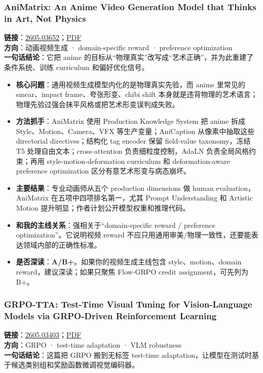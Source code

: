 \subsubsection{AniMatrix: An Anime Video Generation Model that Thinks in Art, Not Physics}

\textbf{链接}：\href{https://arxiv.org/abs/2605.03652}{2605.03652}；\href{https://arxiv.org/pdf/2605.03652}{PDF}\\
\textbf{方向}：动画视频生成 · domain-specific reward · preference optimization\\
\textbf{一句话结论}：它把 anime 的目标从“物理真实”改写成“艺术正确”，并为此重建了条件系统、训练 curriculum 和偏好优化信号。

\begin{itemize}[leftmargin=1.5em]
  \item \textbf{核心问题}：通用视频生成模型内化的是物理真实先验，而 anime 里常见的 smear、impact frame、夸张形变、chibi shift 本身就是违背物理的艺术语言；物理先验过强会抹平风格或把艺术形变误判成失败。
  \item \textbf{方法抓手}：AniMatrix 使用 Production Knowledge System 把 anime 拆成 Style、Motion、Camera、VFX 等生产变量；AniCaption 从像素中抽取这些 directorial directives；结构化 tag encoder 保留 field-value taxonomy，冻结 T5 处理自由文本；cross-attention 负责细粒度控制，AdaLN 负责全局风格约束；再用 style-motion-deformation curriculum 和 deformation-aware preference optimization 区分有意艺术形变与病态崩坏。
  \item \textbf{主要结果}：专业动画师从五个 production dimensions 做 human evaluation，AniMatrix 在五项中四项排名第一，尤其 Prompt Understanding 和 Artistic Motion 提升明显；作者计划公开模型权重和推理代码。
  \item \textbf{和我的主线关系}：强相关于“domain-specific reward / preference optimization”。它说明视频 reward 不应只用通用审美/物理一致性，还要能表达领域内部的正确性标准。
  \item \textbf{是否深读}：\textbf{A/B+}。如果你的视频生成主线包含 style、motion、domain reward，建议深读；如果只聚焦 Flow-GRPO credit assignment，可先列为 B+。
\end{itemize}

\subsubsection{GRPO-TTA: Test-Time Visual Tuning for Vision-Language Models via GRPO-Driven Reinforcement Learning}

\textbf{链接}：\href{https://arxiv.org/abs/2605.03403}{2605.03403}；\href{https://arxiv.org/pdf/2605.03403}{PDF}\\
\textbf{方向}：GRPO · test-time adaptation · VLM robustness\\
\textbf{一句话结论}：这篇把 GRPO 搬到无标签 test-time adaptation，让模型在测试时基于候选类别组和奖励函数微调视觉编码器。


